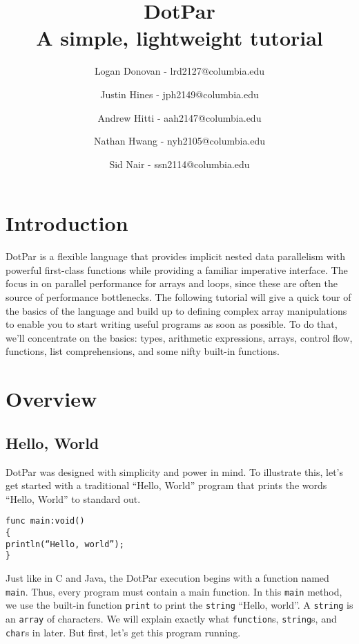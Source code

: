 \documentclass{article}
\begin{document}
\title{DotPar \\ A simple, lightweight tutorial}
\author{
Logan Donovan - lrd2127@columbia.edu \and
Justin Hines - jph2149@columbia.edu \and
Andrew Hitti - aah2147@columbia.edu \and
Nathan Hwang - nyh2105@columbia.edu \and
Sid Nair - ssn2114@columbia.edu}
\maketitle

\section{Introduction}
DotPar is a flexible language that provides implicit nested data parallelism with powerful first-class functions while providing a familiar imperative interface. The focus in on parallel performance for arrays and loops, since these are often the source of performance bottlenecks. The following tutorial will give a quick tour of the basics of the language and build up to defining complex array manipulations to enable you to start writing useful programs as soon as possible. To do that, we’ll concentrate on the basics: types, arithmetic expressions, arrays, control flow, functions, list comprehensions, and some nifty built-in functions.

\section{Overview}
\subsection{Hello, World}
DotPar was designed with simplicity and power in mind. To illustrate this, let’s get started with a traditional “Hello, World” program that prints the words “Hello, World” to standard out.

\begin{verbatim}
func main:void()
{
println(“Hello, world”);
}
\end{verbatim}

Just like in C and Java, the DotPar execution begins with a function named \verb!main!. Thus, every program must contain a main function. In this \verb!main! method, we use the built-in function \verb!print! to print the \verb!string! “Hello, world”. A \verb!string! is an \verb!array! of characters. We will explain exactly what \verb!function!s, \verb!string!s, and \verb!char!s in later. But first, let’s get this program running.
\end{document}
